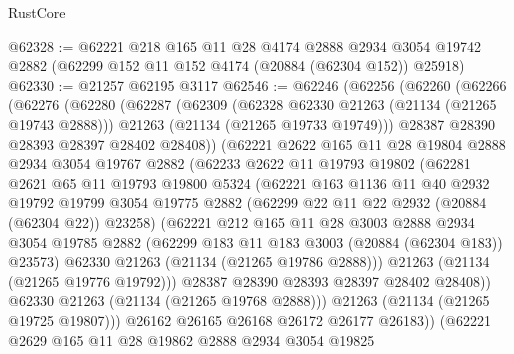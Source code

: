 \begin{lexlean}{RustCore}
\begin{coremodule}
@62328 := @62221
    @218
    @165
    @11
    @28
    @4174
    @2888
    @2934
    @3054
    @19742
    @2882
    (@62299 @152 @11 @152 @4174 (@20884 (@62304 @152)) @25918)
@62330 := @21257 @62195 @3117
@62546 := @62246
    (@62256
      (@62260
        (@62266
          (@62276
            (@62280
              (@62287
                (@62309
                  (@62328 @62330 @21263 (@21134 (@21265 @19743 @2888)))
                  @21263
                  (@21134 (@21265 @19733 @19749)))
                @28387
                @28390
                @28393
                @28397
                @28402
                @28408))
            (@62221
              @2622
              @165
              @11
              @28
              @19804
              @2888
              @2934
              @3054
              @19767
              @2882
              (@62233
                @2622
                @11
                @19793
                @19802
                (@62281
                  @2621
                  @65
                  @11
                  @19793
                  @19800
                  @5324
                  (@62221
                    @163
                    @1136
                    @11
                    @40
                    @2932
                    @19792
                    @19799
                    @3054
                    @19775
                    @2882
                    (@62299 @22 @11 @22 @2932 (@20884 (@62304 @22)) @23258)
                    (@62221
                      @212
                      @165
                      @11
                      @28
                      @3003
                      @2888
                      @2934
                      @3054
                      @19785
                      @2882
                      (@62299 @183 @11 @183 @3003 (@20884 (@62304 @183)) @23573)
                      @62330
                      @21263
                      (@21134 (@21265 @19786 @2888)))
                    @21263
                    (@21134 (@21265 @19776 @19792)))
                  @28387
                  @28390
                  @28393
                  @28397
                  @28402
                  @28408))
              @62330
              @21263
              (@21134 (@21265 @19768 @2888)))
            @21263
            (@21134 (@21265 @19725 @19807)))
          @26162
          @26165
          @26168
          @26172
          @26177
          @26183))
      (@62221
        @2629
        @165
        @11
        @28
        @19862
        @2888
        @2934
        @3054
        @19825

\end{coremodule}
\end{lexlean}
